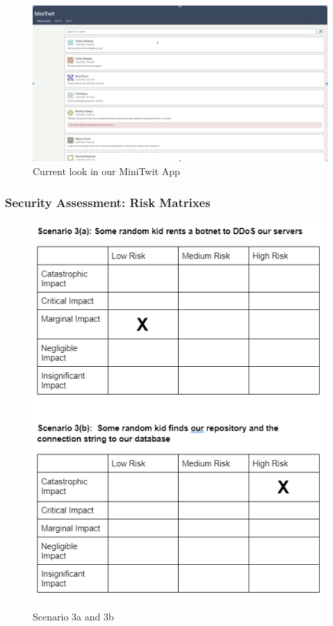 \documentclass{article}
\begin{document}
\begin{figure}[h!]
    \centering
    \includegraphics[scale=0.5]{images/minitwit.png}
    \caption{ Current look in our MiniTwit App }
\end{figure}

\subsubsection{Security Assessment: Risk Matrixes}
\begin{figure}[h!]
    \centering
    \includegraphics[scale=0.5]{images/risk_1.PNG}
    \caption{ Scenario 3a and 3b }
\end{figure}
\end{document}
